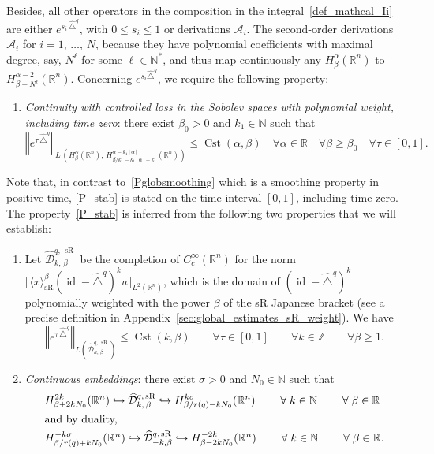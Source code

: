 \documentclass[AHL,Unicode,published]{cedram}
\newcommand*\R{\mathbb{R}}
\newcommand*\N{\mathbb{N}}
\newcommand*\Z{\mathbb{Z}}
\newcommand{\calA}{\mathcal{A}}
\newcommand{\calD}{\mathcal{D}}
\DeclareMathOperator{\Cst}{Cst}
\DeclareMathOperator{\id}{id}
\DeclareMathOperator{\sR}{sR}
\renewcommand{\geq}{\geqslant}
\renewcommand{\leq}{\leqslant}
\newcommand*{\Penumi}{\renewcommand*{\theenumi}{$\mathbf{P}_\arabic{enumi}$}}
\let\oldforall\forall
\renewcommand*{\forall}{\mathrel{\oldforall}}
\begin{document}
Besides, all other operators in the composition in the integral~\eqref{def_mathcal_Ii} are either $e^{s_i\,\widehat{\triangle}^{q}}$, with $0\leq s_i\leq 1$ or derivations $\calA_i$. The second-order derivations $\calA_i$ for $i=1,\,\ldots,\,N$, because they have polynomial coefficients with maximal degree, say, $N^\ell$ for some $\ell\in\N^*$, and thus map continuously any $H^\alpha_\beta(\R^n)$ to $H^{\alpha-2}_{\beta-N^\ell}(\R^n)$. Concerning $e^{s_i \widehat{\triangle}^{q}}$, we require the following property:
\begin{enumerate}\Penumi
\setcounter{enumi}{1}
\item\label{P_stab}
\emph{Continuity with controlled loss in the Sobolev spaces with polynomial weight, including time zero}: there exist $\beta_0>0$ and $k_1\in\N$ such that
\[
\left\Vert e^{\tau\,\widehat{\triangle}^{q}}\right\Vert_{L\,\left(H^\alpha_\beta\left(\R^n\right),\,H^{\alpha-k_1\,\vert\,\alpha\,\vert}_{\beta/k_1-k_1\,\vert\,\alpha\,\vert-k_1}\left(\R^n\right)\right)} \leq \Cst(\alpha,\beta) \quad
\forall \alpha\in\R\quad\forall\beta\geq\beta_0 \quad \forall\tau\in[0,1].
\]
\end{enumerate}
Note that, in contrast to~\eqref{Pglobsmoothing} which is a smoothing property in positive time, \eqref{P_stab} is stated on the time interval $[0,1]$, including time zero. The property~\eqref{P_stab} is inferred from the following two properties that we will establish:
\begin{enumerate}\Penumi
\setcounter{enumi}{2}
\item\label{P_semigroup} Let $\widehat{\calD}^{q,\,\sR}_{k,\,\beta}$ be the completion of $C_c^\infty(\R^n)$ for the norm $\Vert \langle x\rangle_{\sR}^\beta(\id - \widehat{\triangle}^{q})^k u\Vert_{L^2(\R^n)}$, which is the domain of $(\id - \widehat{\triangle}^{q})^k$ polynomially weighted with the power $\beta$ of the sR Japanese bracket (see a precise definition in Appendix~\ref{sec:global_estimates_sR_weight}). We have
\[
\left\Vert e^{\tau\,\widehat{\triangle}^{q}} \right\Vert_{L\left(\widehat{\calD}^{q,\,\sR}_{k,\,\beta}\right)} \leq \Cst(k,\beta) \qquad \forall \tau\in[0,1] \qquad \forall k\in\Z\qquad \forall \beta\geq 1.
\]

\item\label{P_contembed}
\emph{Continuous embeddings}: there exist $\sigma>0$ and $N_0\in\N$ such that
\begin{align*}
&H^{2k}_{\beta+2kN_0}(\R^n) \hookrightarrow \widehat{\calD}^{q,\,\sR}_{k,\,\beta} \hookrightarrow H^{k\sigma}_{\beta/r(q)-kN_0}(\R^n)
\qquad\forall k\in\N\qquad\forall\beta\in\R
\\
\intertext{and by duality,}
&H^{-k\sigma}_{\beta/r(q)+kN_0}(\R^n) \hookrightarrow \widehat{\calD}^{q,\,\sR}_{-k,\beta} \hookrightarrow H^{-2k}_{\beta-2kN_0}(\R^n)\qquad \forall k\in\N\qquad\forall\beta\in\R.
\end{align*}
\end{enumerate}
\end{document}
